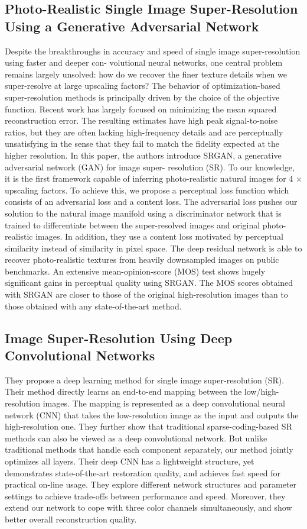 \subsection{Photo-Realistic Single Image Super-Resolution Using a Generative Adversarial Network}
Despite the breakthroughs in accuracy and speed of single image super-resolution using faster and deeper con- volutional neural networks, one central problem remains largely unsolved: how do we recover the finer texture details when we super-resolve at large upscaling factors? The behavior of optimization-based super-resolution methods is principally driven by the choice of the objective function. Recent work has largely focused on minimizing the mean squared reconstruction error. The resulting estimates have high peak signal-to-noise ratios, but they are often lacking high-frequency details and are perceptually unsatisfying in the sense that they fail to match the fidelity expected at the higher resolution. In this paper, the authors introduce SRGAN, a generative adversarial network (GAN) for image super- resolution (SR). To our knowledge, it is the first framework capable of inferring photo-realistic natural images for 4 × upscaling factors. To achieve this, we propose a perceptual loss function which consists of an adversarial loss and a content loss. The adversarial loss pushes our solution to the natural image manifold using a discriminator network that is trained to differentiate between the super-resolved images and original photo-realistic images. In addition, they use a content loss motivated by perceptual similarity instead of similarity in pixel space. The deep residual network is able to recover photo-realistic textures from heavily downsampled images on public benchmarks. An extensive mean-opinion-score (MOS) test shows hugely significant gains in perceptual quality using SRGAN. The MOS scores obtained with SRGAN are closer to those of the original high-resolution images than to those obtained with any state-of-the-art method.

\subsection{Image Super-Resolution Using Deep Convolutional Networks}
They propose a deep learning method for single image super-resolution (SR). Their method directly learns an end-to-end mapping between the low/high-resolution images. The mapping is represented as a deep convolutional neural network (CNN) that takes the low-resolution image as the input and outputs the high-resolution one. They further show that traditional sparse-coding-based SR methods can also be viewed as a deep convolutional network. But unlike traditional methods that handle each component separately, our method jointly optimizes all layers. Their deep CNN has a lightweight structure, yet demonstrates state-of-the-art restoration quality, and achieves fast speed for practical on-line usage. They explore different network structures and parameter settings to achieve trade-offs between performance and speed. Moreover, they extend our network to cope with three color channels simultaneously, and show
better overall reconstruction quality.
